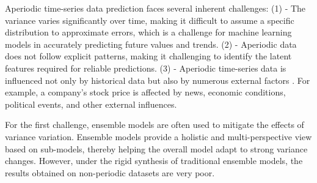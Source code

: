 \documentclass[aps,prb,groupedaddress,twocolumn,showpacs,dvipdfmx,superscriptaddress,pdftex]{revtex4-2}
\begin{document}
Aperiodic time-series data prediction faces several inherent challenges: (1) - The variance varies significantly over time, making it difficult to assume a specific distribution to approximate errors, which is a challenge for machine learning models in accurately predicting future values and trends. (2) - Aperiodic data does not follow explicit patterns, making it challenging to identify the latent features required for reliable predictions. (3) - Aperiodic time-series data is influenced not only by historical data but also by numerous external factors \cite{li2019multi}. For example, a company's stock price is affected by news, economic conditions, political events, and other external influences.

\vspace{2mm}


For the first challenge, ensemble models \citep{sadeghi2021combined, zafeiriou2020intraday, ali2020complete} are often used to mitigate the effects of variance variation. Ensemble models provide a holistic and multi-perspective view based on sub-models, thereby helping the overall model adapt to strong variance changes. However, under the rigid synthesis of traditional ensemble models, the results obtained on non-periodic datasets are very poor.

\vspace{2mm}

\end{document}
